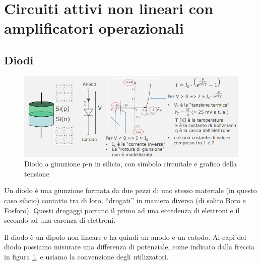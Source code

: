 \documentclass{article}
\begin{document}
\clearpage



















\section{Circuiti attivi non lineari con amplificatori operazionali}

\subsection{Diodi}

\begin{figure}[h]
  \centering
  \includegraphics[scale=0.55]{IM_diodo_p_n}
  \caption{Diodo a giunzione p-n in silicio, con simbolo circuitale e grafico della tensione}
  \label{Schema_diodo_p_n}
\end{figure}

Un diodo è una giunzione formata da due pezzi di uno stesso materiale (in questo caso silicio) contatto tra di loro, ``drogati'' in maniera diversa (di solito Boro e Fosforo). Questi drogaggi portano il primo ad una eccedenza di elettroni e il secondo ad una carenza di elettroni.

\vspace{3mm}

Il diodo è un dipolo non lineare e ha quindi un anodo e un catodo. Ai capi del diodo possiamo misurare una differenza di potenziale, come indicato dalla freccia in figura \ref{Schema_diodo_p_n}, e usiamo la convenzione degli utilizzatori. 

\vspace{3mm}
\end{document}
